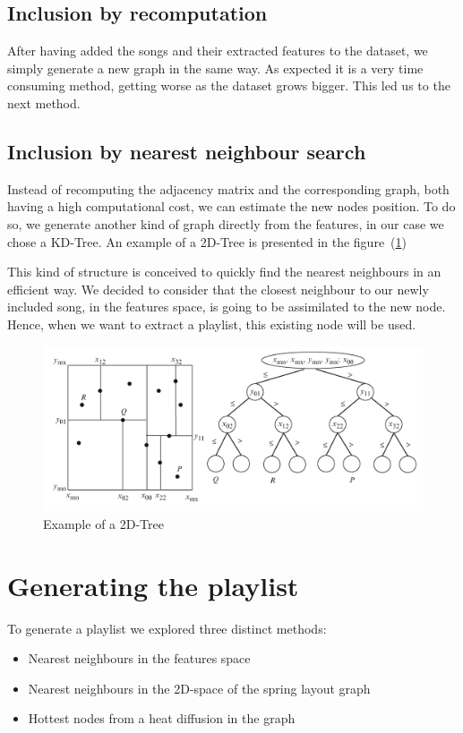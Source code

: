 \documentclass[11pt,a4paper,twoside]{article}
\begin{document}
\subsection{Inclusion by recomputation}
After having added the songs and their extracted features to the dataset, we simply generate a new graph in the same way. As expected it is a very time consuming method, getting worse as the dataset grows bigger. This led us to the next method. 

\subsection{Inclusion by nearest neighbour search}
Instead of recomputing the adjacency matrix and the corresponding graph, both having a high computational cost, we can estimate the new nodes position. To do so, we generate another kind of graph directly from the features, in our case we chose a KD-Tree.
An example of a 2D-Tree is presented in the figure~(\ref{fig:ex_tree})

This kind of structure is conceived to quickly find the nearest neighbours in an efficient way.
We decided to consider that the closest neighbour to our newly included song, in the features space, is going to be assimilated to the new node. Hence, when we want to extract a playlist, this existing node will be used. 

\begin{figure}[H]
  \centering
    \includegraphics[width=.7\textwidth]{./Figures/tree}
  \caption{Example of a 2D-Tree}
  \label{fig:ex_tree}
\end{figure}

\section{Generating the playlist}

To generate a playlist we explored three distinct methods:
\begin{itemize}
\item Nearest neighbours in the features space
\item Nearest neighbours in the 2D-space of the spring layout graph 
\item Hottest nodes from a heat diffusion in the graph
\end{itemize}
\end{document}
